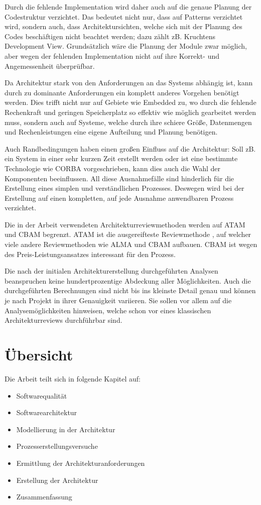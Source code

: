 Durch die fehlende Implementation wird daher auch auf die genaue Planung der Codestruktur verzichtet. Das bedeutet nicht nur, dass auf Patterns verzichtet wird, sondern auch, dass Architektursichten, welche sich mit der Planung des Codes beschäftigen nicht beachtet werden; dazu zählt zB. Kruchtens Development View. Grundsätzlich wäre die Planung der Module zwar möglich, aber wegen der fehlenden Implementation nicht auf ihre Korrekt- und Angemessenheit überprüfbar.

Da Architektur stark von den Anforderungen an das Systems abhängig ist, kann durch zu dominante Anforderungen ein komplett anderes Vorgehen benötigt werden. Dies trifft nicht nur auf Gebiete wie Embedded zu, wo durch die fehlende Rechenkraft und geringen Speicherplatz so effektiv wie möglich gearbeitet werden muss, sondern auch auf Systeme, welche durch ihre schiere Größe, Datenmengen und Rechenleistungen eine eigene Aufteilung und Planung benötigen.

Auch Randbedingungen haben einen großen Einfluss auf die Architektur: Soll zB. ein System in einer sehr kurzen Zeit erstellt werden oder ist eine bestimmte Technologie wie CORBA vorgeschrieben, kann dies auch die Wahl der Komponenten beeinflussen. All diese Ausnahmefälle sind hinderlich für die Erstellung eines simplen und verständlichen Prozesses. Deswegen wird bei der Erstellung auf einen kompletten, auf jede Ausnahme anwendbaren Prozess verzichtet.

Die in der Arbeit verwendeten Architekturreviewmethoden werden auf ATAM und CBAM begrenzt. ATAM ist die ausgereifteste Reviewmethode \cite[S. 184]{basiswissen}, auf welcher viele andere Reviewmethoden wie ALMA und CBAM aufbauen. CBAM ist wegen des Preis-Leistungsansatzes interessant für den Prozess.

Die nach der initialen Architekturerstellung durchgeführten Analysen beanspruchen keine hundertprozentige Abdeckung aller Möglichkeiten. Auch die durchgeführten Berechnungen sind nicht bis ins kleinste Detail genau und können je nach Projekt in ihrer Genauigkeit variieren. Sie sollen vor allem auf die Analysemöglichkeiten hinweisen, welche schon vor eines klassischen Architekturreviews durchführbar sind.

\section{Übersicht}
Die Arbeit teilt sich in folgende Kapitel auf:

\begin{itemize}
  \item Softwarequalität
  \item Softwarearchitektur
  \item Modellierung in der Architektur
  \item Prozesserstellungsversuche
  \item Ermittlung der Architekturanforderungen
  \item Erstellung der Architektur
  \item Zusammenfassung
\end{itemize}


